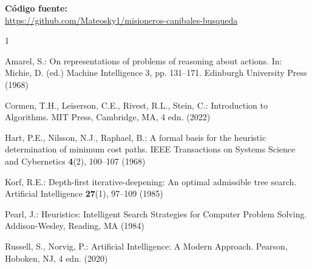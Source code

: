 \documentclass[runningheads]{llncs}
\newcommand{\repo}{https://github.com/Mateosky1/misioneros-canibales-busqueda}
\begin{document}
\medskip
\noindent\textbf{Código fuente:}\\ \url{\repo}

\begin{thebibliography}{1}
\providecommand{\url}[1]{\texttt{#1}}
\providecommand{\urlprefix}{URL }
\providecommand{\doi}[1]{https://doi.org/#1}

Amarel, S.: On representations of problems of reasoning about actions. In:
  Michie, D. (ed.) Machine Intelligence 3, pp. 131--171. Edinburgh University
  Press (1968)

Cormen, T.H., Leiserson, C.E., Rivest, R.L., Stein, C.: Introduction to
  Algorithms. MIT Press, Cambridge, MA, 4 edn. (2022)

Hart, P.E., Nilsson, N.J., Raphael, B.: A formal basis for the heuristic
  determination of minimum cost paths. IEEE Transactions on Systems Science and
  Cybernetics  \textbf{4}(2),  100--107 (1968)

Korf, R.E.: Depth-first iterative-deepening: An optimal admissible tree search.
  Artificial Intelligence  \textbf{27}(1),  97--109 (1985)

Pearl, J.: Heuristics: Intelligent Search Strategies for Computer Problem
  Solving. Addison-Wesley, Reading, MA (1984)

Russell, S., Norvig, P.: Artificial Intelligence: A Modern Approach. Pearson,
  Hoboken, NJ, 4 edn. (2020)

\end{thebibliography}
\end{document}
